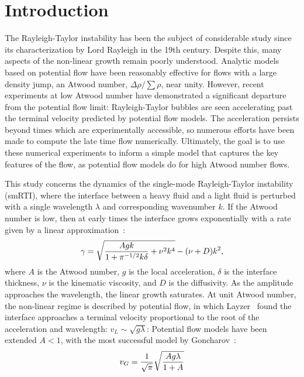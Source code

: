 \section{Introduction} 

The Rayleigh-Taylor instability has been the subject of considerable study since its characterization by Lord Rayleigh in the 19th century.
Despite this, many aspects of the non-linear growth remain poorly understood.
Analytic models based on potential flow have been reasonably effective for flows with a large density jump, \ie an Atwood number, $\Delta \rho / \sum \rho$, near unity.
However, recent experiments at low Atwood number have demonstrated a significant departure from the potential flow limit:
Rayleigh-Taylor bubbles are seen accelerating past the terminal velocity predicted by potential flow models.
The acceleration persists beyond times which are experimentally accessible, so numerous efforts have been made to compute the late time flow numerically.
Ultimately, the goal is to use these numerical experiments to inform a simple model that captures the key features of the flow, as potential flow models do for high Atwood number flows.

This study concerns the dynamics of the single-mode Rayleigh-Taylor instability (smRTI), where the interface between a heavy fluid and a light fluid is perturbed with a single wavelength $\lambda$ and corresponding wavenumber $k$.
If the Atwood number is low, then at early times the interface grows exponentially with a rate given by a linear approximation~\cite{Duff1962}:
\begin{equation} \elabel{duff0}
\gamma = \sqrt{\frac{A g k}{1 + \pi^{-1/2} k \delta} + \nu^2 k^4} - (\nu + D) k^2,
\end{equation}
where $A$ is the Atwood number,
$g$ is the local acceleration,
$\delta$ is the interface thickness,
$\nu$ is the kinematic viscosity, and
$D$ is the diffusivity.
As the amplitude approaches the wavelength, the linear growth saturates.
At unit Atwood number, the non-linear regime is described by potential flow, in which Layzer~\cite{Layzer1955} found the interface approaches a terminal velocity proportional to the root of the acceleration and wavelength: $v_L \sim \sqrt{g \lambda}$:
Potential flow models have been extended $A < 1$, with the most successful model by Goncharov~\cite{Goncharov2002}:
\begin{equation} \elabel{goncharov}
v_G = \frac{1}{\sqrt{\pi}} \sqrt{\frac{A g \lambda}{1+A}}
\end{equation}


